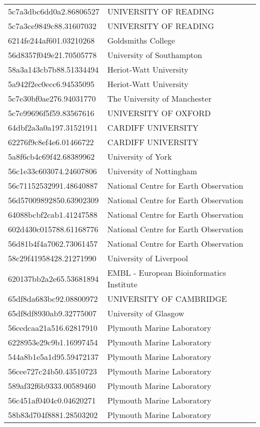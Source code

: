 \begin{tabular}{ll}
5c7a3dbc6dd0a2.86806527 & UNIVERSITY OF READING \\
5c7a3ce9849c88.31607032 & UNIVERSITY OF READING \\
6214fe244af601.03210268 & Goldsmiths College \\
56d8357f049e21.70505778 & University of Southampton \\
58a3a143cb7b88.51334494 & Heriot-Watt University \\
5a942f2ec0ecc6.94535095 & Heriot-Watt University \\
5c7e30bf0ae276.94031770 & The University of Manchester \\
5c7e99696f5f59.83567616 & UNIVERSITY OF OXFORD \\
64dbf2a3a0a197.31521911 & CARDIFF UNIVERSITY \\
62276f9c8ef4e6.01466722 & CARDIFF UNIVERSITY \\
5a8f6cb4c69f42.68389962 & University of York \\
56c1e33c603074.24607806 & University of Nottingham \\
56c71152532991.48640887 & National Centre for Earth Observation \\
56d57009892850.63902309 & National Centre for Earth Observation \\
64088bcbf2cab1.41247588 & National Centre for Earth Observation \\
602d430c015788.61168776 & National Centre for Earth Observation \\
56d81b4f4a7062.73061457 & National Centre for Earth Observation \\
58c29f41958428.21271990 & University of Liverpool \\
620137bb2a2e65.53681894 & EMBL - European Bioinformatics Institute \\
65df8da683bc92.08800972 & UNIVERSITY OF CAMBRIDGE \\
65df8df8930ab9.32775007 & University of Glasgow \\
56cedcaa21a516.62817910 & Plymouth Marine Laboratory \\
6228953e29c9b1.16997454 & Plymouth Marine Laboratory \\
544a8b1e5a1d95.59472137 & Plymouth Marine Laboratory \\
56cee727c24b50.43510723 & Plymouth Marine Laboratory \\
589af32f6b9333.00589460 & Plymouth Marine Laboratory \\
56c451af0404c0.04620271 & Plymouth Marine Laboratory \\
58b83d704f8881.28503202 & Plymouth Marine Laboratory \\

\end{tabular}
